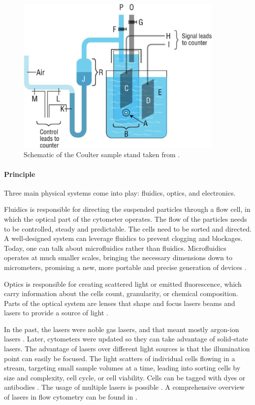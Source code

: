     \begin{figure}[h!]
        \centering
        \includegraphics[width=0.9\textwidth]{Figures/coulter.jpeg}
        \caption{Schematic of the Coulter sample stand taken from \cite{don2003coulter}.} 
        \label{fig:twofeat}
    \end{figure}


\paragraph{Principle}
\label{sec:flowprinc}
Three main physical systems come into play: fluidics, optics, and electronics. 

Fluidics is responsible for directing the suspended particles through a flow cell, in which the optical part of the cytometer operates. The flow of the particles needs to be controlled, steady and predictable. The cells need to be sorted and directed. A well-designed system can leverage fluidics to prevent clogging and blockages. Today, one can talk about microfluidics rather than fluidics. Microfluidics operates at much smaller scales, bringing the necessary dimensions down to micrometers, promising a new, more portable and precise generation of devices \citep{gong2019new}.

Optics is responsible for creating scattered light or emitted fluorescence, which carry information about the cells count, granularity, or chemical composition. Parts of the optical system are lenses that shape and focus lasers beams and lasers to provide a source of light \citep{adan2017flow}.

In the past, the lasers were noble gas lasers, and that meant mostly argon-ion lasers \citep{kamentsky1991microscope}. Later, cytometers were updated so they can take advantage of solid-state lasers. The advantage of lasers over different light sources is that the illumination point can easily be focused. The light scatters of individual cells flowing in a stream, targeting small sample volumes at a time, leading into sorting cells by size and complexity, cell cycle, or cell viability. Cells can be tagged with dyes or antibodies \citep{wilkerson2012principles}. The usage of multiple lasers is possible \citep{bigos1999nine, de2016quantification, ashcroft2000commercial}. A comprehensive overview of lasers in flow cytometry can be found in \cite{shapiro2018lasers}.

